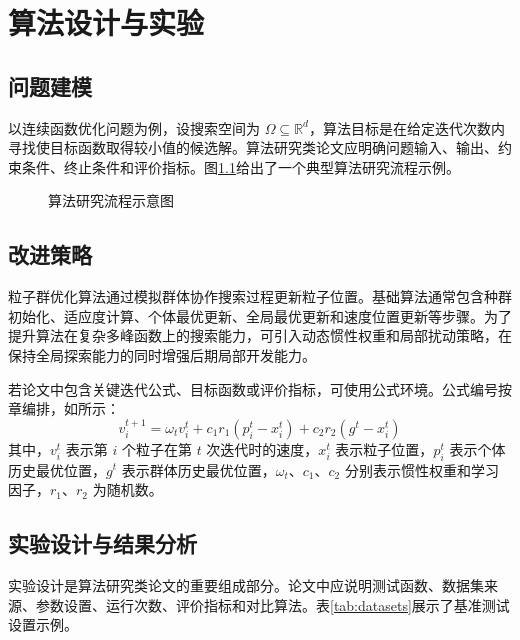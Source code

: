 \chapter{算法设计与实验}

\section{问题建模}

以连续函数优化问题为例，设搜索空间为 $\Omega\subseteq\mathbb{R}^{d}$，算法目标是在给定迭代次数内寻找使目标函数取得较小值的候选解。算法研究类论文应明确问题输入、输出、约束条件、终止条件和评价指标。图\ref{fig:framework}给出了一个典型算法研究流程示例。

\begin{figure}[htbp]
  \centering
  \caption{算法研究流程示意图}
  \label{fig:framework}
\end{figure}

\section{改进策略}

粒子群优化算法通过模拟群体协作搜索过程更新粒子位置。基础算法通常包含种群初始化、适应度计算、个体最优更新、全局最优更新和速度位置更新等步骤。为了提升算法在复杂多峰函数上的搜索能力，可引入动态惯性权重和局部扰动策略，在保持全局探索能力的同时增强后期局部开发能力。

若论文中包含关键迭代公式、目标函数或评价指标，可使用公式环境。公式编号按章编排，如所示：
\begin{equation}
  v_i^{t+1}=\omega_t v_i^t+c_1 r_1(p_i^t-x_i^t)+c_2 r_2(g^t-x_i^t)
  \label{eq:update}
\end{equation}
其中，$v_i^t$ 表示第 $i$ 个粒子在第 $t$ 次迭代时的速度，$x_i^t$ 表示粒子位置，$p_i^t$ 表示个体历史最优位置，$g^t$ 表示群体历史最优位置，$\omega_t$、$c_1$、$c_2$ 分别表示惯性权重和学习因子，$r_1$、$r_2$ 为随机数。

\section{实验设计与结果分析}

实验设计是算法研究类论文的重要组成部分。论文中应说明测试函数、数据集来源、参数设置、运行次数、评价指标和对比算法。表\ref{tab:datasets}展示了基准测试设置示例。

